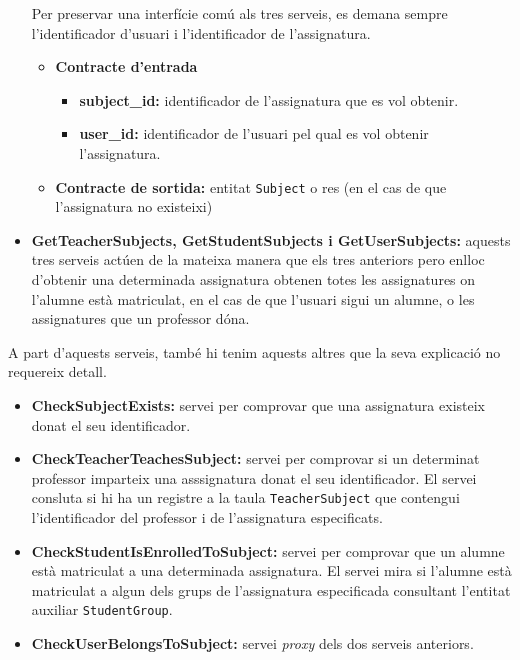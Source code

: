 \begin{itemize}
			Per preservar una interfície comú als tres serveis, es demana sempre l'identificador d'usuari i l'identificador de l'assignatura.
			
			\begin{itemize}
					\item \textbf{Contracte d'entrada}
						\begin{itemize}
							\item \textbf{subject\_id:} identificador de l'assignatura que es vol obtenir.
							\item \textbf{user\_id:} identificador de l'usuari pel qual es vol obtenir l'assignatura.
						\end{itemize}
					\item \textbf{Contracte de sortida:} entitat \texttt{Subject} o res (en el cas de que l'assignatura no existeixi)
				\end{itemize}
			\item \textbf{GetTeacherSubjects, GetStudentSubjects i GetUserSubjects:} aquests tres serveis actúen de la mateixa manera que els tres anteriors pero enlloc d'obtenir una determinada assignatura obtenen totes les assignatures on l'alumne està matriculat, en el cas de que l'usuari sigui un alumne, o les assignatures que un professor dóna.
		\end{itemize}
		
		A part d'aquests serveis, també hi tenim aquests altres que la seva explicació no requereix detall.
		
		\begin{itemize}
			\item \textbf{CheckSubjectExists:} servei per comprovar que una assignatura existeix donat el seu identificador.
			\item \textbf{CheckTeacherTeachesSubject:} servei per comprovar si un determinat professor imparteix una asssignatura donat el seu identificador. El servei consluta si hi ha un registre a la taula \texttt{TeacherSubject} que contengui l'identificador del professor i de l'assignatura especificats.
			
			\item \textbf{CheckStudentIsEnrolledToSubject:} servei per comprovar que un alumne està matriculat a una determinada assignatura. El servei mira si l'alumne està matriculat a algun dels grups de l'assignatura especificada consultant l'entitat auxiliar \texttt{StudentGroup}.
			
			\item \textbf{CheckUserBelongsToSubject:} servei \emph{proxy} dels dos serveis anteriors.
		\end{itemize}
		
